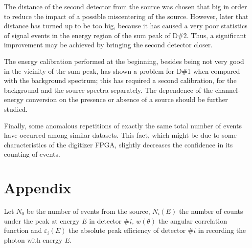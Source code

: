\documentclass[a4paper]{article}
\begin{document}
The distance of the second detector from the source was chosen that big in order to reduce the impact of a possible miscentering of the source. However, later that distance has turned up to be too big, because it has caused a very poor statistics of signal events in the energy region of the sum peak of D\#2. Thus, a significant improvement may be achieved by bringing the second detector closer.

The energy calibration performed at the beginning, besides being not very good in the vicinity of the sum peak, has shown a problem for D\#1 when compared with the background spectrum; this has required a second calibration, for the background and the source spectra separately. The dependence of the channel-energy conversion on the presence or absence of a source should be further studied. 

Finally, some anomalous repetitions of exactly the same total number of events have occurred among similar datasets. This fact, which might be due to some characteristics of the digitizer FPGA, slightly decreases the confidence in its counting of events. %


\newpage
\section{Appendix}
Let $N_0$ be the number of events from the source, $N_i(E)$ the number of counts under the peak at energy $E$ in detector $\#i$, $w(\theta)$ the angular correlation function and $\varepsilon_{i}(E)$ the absolute peak efficiency of detector $\#i$ in recording the photon with energy $E$. 
 
\end{document}
